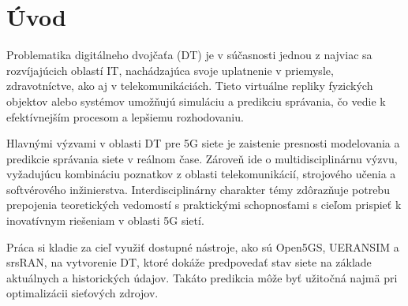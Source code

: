 \chapter{Úvod}
\par{
Problematika digitálneho dvojčaťa (DT) je v súčasnosti jednou z najviac sa rozvíjajúcich oblastí IT, nachádzajúca svoje uplatnenie v priemysle, zdravotníctve, ako aj v telekomunikáciách. Tieto virtuálne repliky fyzických objektov alebo systémov umožňujú simuláciu a predikciu správania, čo vedie k efektívnejším procesom a lepšiemu rozhodovaniu.
}

\par{
Hlavnými výzvami v oblasti DT pre 5G siete je zaistenie presnosti modelovania a predikcie správania siete v reálnom čase. Zároveň ide o multidisciplinárnu výzvu, vyžadujúcu kombináciu poznatkov z oblasti telekomunikácií, strojového učenia a softvérového inžinierstva. Interdisciplinárny charakter témy zdôrazňuje potrebu prepojenia teoretických vedomostí s praktickými schopnosťami s cieľom prispieť k inovatívnym riešeniam v oblasti 5G sietí.
}
\par{
Práca si kladie za cieľ využiť dostupné nástroje, ako sú Open5GS, UERANSIM a srsRAN, na vytvorenie DT, ktoré dokáže predpovedať stav siete na základe aktuálnych a historických údajov. Takáto predikcia môže byť užitočná najmä pri optimalizácii sieťových zdrojov.
}